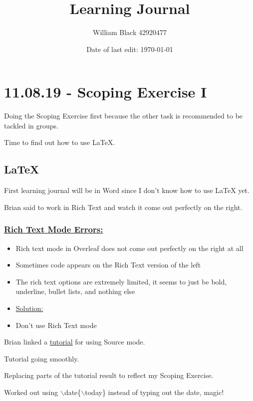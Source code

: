 \documentclass[12pt]{article}
\title{\textbf{Learning Journal}}
\date{Date of last edit: \today}
\author{William Black 42920477}
\begin{document}
\tableofcontents

\newpage\section{11.08.19 - Scoping Exercise I}

Doing the Scoping Exercise first because the other task is recommended to be tackled in groups.

Time to find out how to use LaTeX.

\subsection{LaTeX}

First learning journal will be in Word since I don’t know how to use LaTeX yet.

Brian said to work in Rich Text and watch it come out perfectly on the right.

\subsubsection{\underline{Rich Text Mode Errors:}}\label{error:er1}
\begin{itemize}
    \item Rich text mode in Overleaf does not come out perfectly on the right at all
    \item Sometimes code appears on the Rich Text version of the left
    \item The rich text options are extremely limited, it seems to just be bold, underline, bullet lists, and nothing else
\end{itemize}
\begin{itemize}
\renewcommand{\labelitemi}{$\nobullet$}
\item \underline{Solution:}
\renewcommand{\labelitemi}{$\bullet$}
    \item Don’t use Rich Text mode
\end{itemize}

Brian linked a \href{https://www.overleaf.com/learn/latex/Creating_a_document_in_LaTeX}{tutorial} for using Source mode.

Tutorial going smoothly.

Replacing parts of the tutorial result to reflect my Scoping Exercise.

Worked out using $\backslash$date\{$\backslash$today\} instead of typing out the date, magic!
\end{document}
